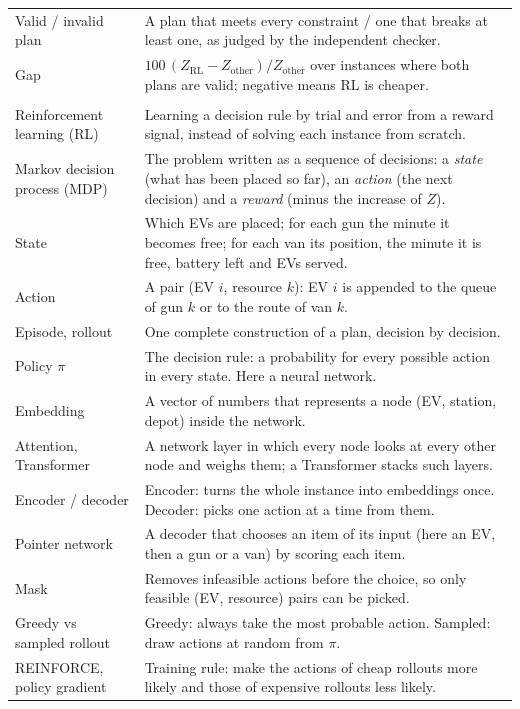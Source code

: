 \begin{xltabular}{\textwidth}{@{}>{\raggedright\arraybackslash}p{4.0cm}X@{}}
Valid / invalid plan & A plan that meets every constraint / one that breaks at least one, as judged by the independent checker. \\
Gap & $100\,(Z_{\mathrm{RL}}-Z_{\mathrm{other}})/Z_{\mathrm{other}}$ over instances where both plans are valid; negative means RL is cheaper. \\
 \\
Reinforcement learning (RL) & Learning a decision rule by trial and error from a reward signal, instead of solving each instance from scratch. \\
Markov decision process (MDP) & The problem written as a sequence of decisions: a \emph{state} (what has been placed so far), an \emph{action} (the next decision) and a \emph{reward} (minus the increase of $Z$). \\
State & Which EVs are placed; for each gun the minute it becomes free; for each van its position, the minute it is free, battery left and EVs served. \\
Action & A pair (EV $i$, resource $k$): EV $i$ is appended to the queue of gun $k$ or to the route of van $k$. \\
Episode, rollout & One complete construction of a plan, decision by decision. \\
Policy $\pi$ & The decision rule: a probability for every possible action in every state. Here a neural network. \\
Embedding & A vector of numbers that represents a node (EV, station, depot) inside the network. \\
Attention, Transformer & A network layer in which every node looks at every other node and weighs them; a Transformer stacks such layers. \\
Encoder / decoder & Encoder: turns the whole instance into embeddings once. Decoder: picks one action at a time from them. \\
Pointer network & A decoder that chooses an item of its input (here an EV, then a gun or a van) by scoring each item. \\
Mask & Removes infeasible actions before the choice, so only feasible (EV, resource) pairs can be picked. \\
Greedy vs sampled rollout & Greedy: always take the most probable action. Sampled: draw actions at random from $\pi$. \\
REINFORCE, policy gradient & Training rule: make the actions of cheap rollouts more likely and those of expensive rollouts less likely. \\

\end{xltabular}
